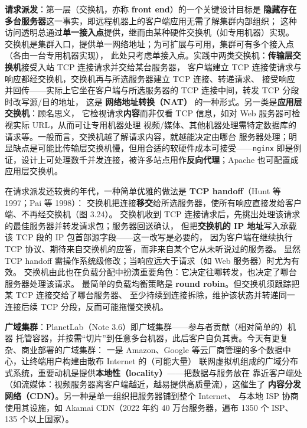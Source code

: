 \medskip\noindent\textbf{请求派发}：第一层（交换机，亦称 \textbf{front end}）的一个关键设计目标是
\textbf{隐藏存在多台服务器}这一事实，即远程机器上的客户端应用无需了解集群内部组织；
这种访问透明总通过\textbf{单一接入点}提供，继而由某种硬件交换机（如专用机器）实现。
交换机是集群入口，提供单一网络地址；为可扩展与可用，集群可有多个接入点（各由一台专用机器实现），
此处只考虑单接入点。实践中两类交换机：\textbf{传输层交换机}接受入站 TCP 连接请求并交给某台服务器，
客户端建立 TCP 连接使请求与响应都经交换机，交换机再与所选服务器建立 TCP 连接、转递请求、
接受响应并回传——实际上它坐在客户端与所选服务器的 TCP 连接中间，转发 TCP 分段时改写源/目的地址，
这是 \textbf{网络地址转换（NAT）} 的一种形式。另一类是\textbf{应用层交换机}：顾名思义，
它检视请求\textbf{内容}而非仅看 TCP 信息，如对 Web 服务器可检视实际 URL，从而可让专用机器处理
视频/媒体、其他机器处理需特定数据库的请求等。一般而言，交换机越了解请求内容，就越能决定由哪台
服务器处理；明显缺点是可能比传输层交换机慢，但用合适的软硬件成本可接受——\texttt{nginx}
即是例证，设计上可处理数千并发连接，被许多站点用作\textbf{反向代理}；Apache 也可配置成
应用层交换机。

\begin{ideabox}
在请求派发还较贵的年代，一种简单优雅的做法是 \textbf{TCP handoff}（Hunt 等 1997；Pai 等 1998）：
交换机把连接\textbf{移交}给所选服务器，使所有响应直接发给客户端、不再经交换机（图 3.24）。
交换机收到 TCP 连接请求后，先挑出处理该请求的最佳服务器并转发请求包；服务器回送确认，
但把\textbf{交换机的 IP 地址}写入承载该 TCP 段的 IP 包首部源字段——这一改写是必要的，
因为客户端在继续执行 TCP 协议、期待来自交换机的应答，而非来自某个它从未听说过的服务器。
显然 TCP handoff 需操作系统级修改；当响应远大于请求（如 Web 服务器）时尤为有效。
交换机由此也在负载分配中扮演重要角色：它决定往哪转发，也决定了哪台服务器处理该请求。
最简单的负载均衡策略是 \textbf{round robin}。但交换机须跟踪把某 TCP 连接交给了哪台服务器、
至少持续到连接拆除，维护该状态并转递同一连接后续 TCP 分段，反而可能拖慢交换机。
\end{ideabox}

\medskip\noindent\textbf{广域集群}：PlanetLab（Note 3.6）即广域集群——参与者贡献（相对简单的）机器
托管容器，并按需“切片”到任意多台机器，此后客户自负其责。今天有更复杂、商业部署的广域集群：
一是 Amazon、Google 等云厂商管理的多个数据中心，让终端用户构建由散布 Internet 的（可能大量）
联网虚拟机组成的广域分布式系统，重要动机是提供\textbf{本地性（locality）}——把数据与服务放在
靠近客户端处（如流媒体：视频服务器离客户端越近，越易提供高质量流），这催生了
\textbf{内容分发网络（CDN）}。另一种是单一组织把服务器铺到整个 Internet、
与本地 ISP 协商使用其设施，如 Akamai CDN（2022 年约 40 万台服务器，遍布 1350 个 ISP、
135 个以上国家）。

